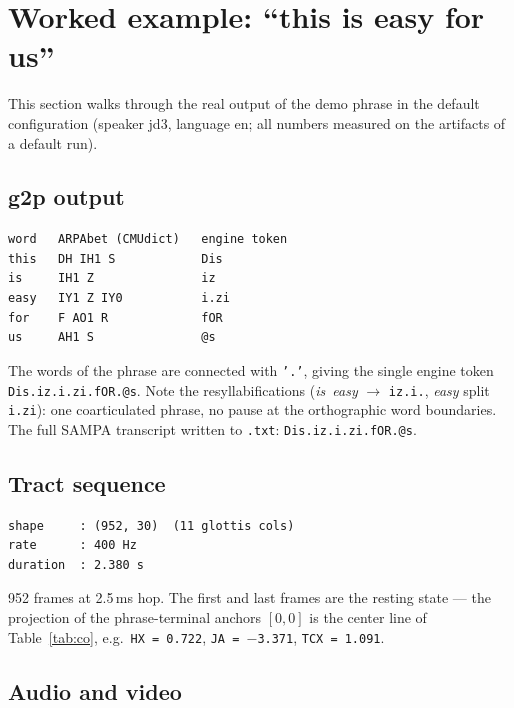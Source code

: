 \documentclass[11pt,a4paper]{article}
\begin{document}
\section{Worked example: ``this is easy for us''}\label{sec:example}

This section walks through the real output of the demo phrase in the
default configuration (speaker jd3, language en; all numbers measured
on the artifacts of a default run).

\subsection{g2p output}

\begin{lstlisting}[style=verbatim]
word   ARPAbet (CMUdict)   engine token
this   DH IH1 S            Dis
is     IH1 Z               iz
easy   IY1 Z IY0           i.zi
for    F AO1 R             fOR
us     AH1 S               @s
\end{lstlisting}

The words of the phrase are connected with \texttt{'.'}, giving the
single engine token \texttt{Dis.iz.i.zi.fOR.@s}. Note the
resyllabifications
(\emph{is\ easy} \(\to\) \texttt{iz.i.}, \emph{easy} split
\texttt{i.zi}): one coarticulated phrase, no pause at the orthographic
word boundaries. The full SAMPA transcript written to \texttt{.txt}:
\texttt{Dis.iz.i.zi.fOR.@s}.

\subsection{Tract sequence}

\begin{lstlisting}[style=verbatim]
shape     : (952, 30)  (11 glottis cols)
rate      : 400 Hz
duration  : 2.380 s
\end{lstlisting}

952 frames at 2.5\,ms hop. The first and last frames are the resting
state --- the projection of the phrase-terminal anchors \([0, 0]\) is the
center line of Table~\ref{tab:co}, e.g.\ \texttt{HX = 0.722},
\texttt{JA = $-$3.371}, \texttt{TCX = 1.091}.

\subsection{Audio and video}
\end{document}
